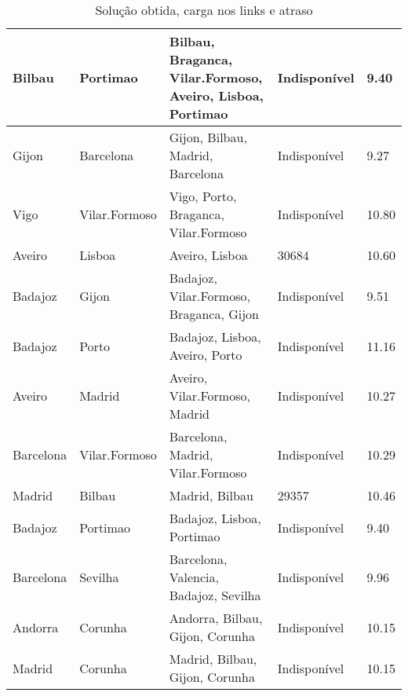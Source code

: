 \begin{table}[!htb]
{\begin{tabular}{|l|l|l|l|l|}
Bilbau & Portimao & Bilbau, Braganca, Vilar.Formoso, Aveiro, Lisboa, Portimao & Indisponível & 9.40 \\ \hline
Gijon & Barcelona & Gijon, Bilbau, Madrid, Barcelona & Indisponível & 9.27 \\ \hline
Vigo & Vilar.Formoso & Vigo, Porto, Braganca, Vilar.Formoso & Indisponível & 10.80 \\ \hline
Aveiro & Lisboa & Aveiro, Lisboa & 30684 & 10.60 \\ \hline
Badajoz & Gijon & Badajoz, Vilar.Formoso, Braganca, Gijon & Indisponível & 9.51 \\ \hline
Badajoz & Porto & Badajoz, Lisboa, Aveiro, Porto & Indisponível & 11.16 \\ \hline
Aveiro & Madrid & Aveiro, Vilar.Formoso, Madrid & Indisponível & 10.27 \\ \hline
Barcelona & Vilar.Formoso & Barcelona, Madrid, Vilar.Formoso & Indisponível & 10.29 \\ \hline
Madrid & Bilbau & Madrid, Bilbau & 29357 & 10.46 \\ \hline
Badajoz & Portimao & Badajoz, Lisboa, Portimao & Indisponível & 9.40 \\ \hline
Barcelona & Sevilha & Barcelona, Valencia, Badajoz, Sevilha & Indisponível & 9.96 \\ \hline
Andorra & Corunha & Andorra, Bilbau, Gijon, Corunha & Indisponível & 10.15 \\ \hline
Madrid & Corunha & Madrid, Bilbau, Gijon, Corunha & Indisponível & 10.15 \\ \hline
\end{tabular}}
\caption[]{Solução obtida, carga nos links e atraso}
\end{table}

